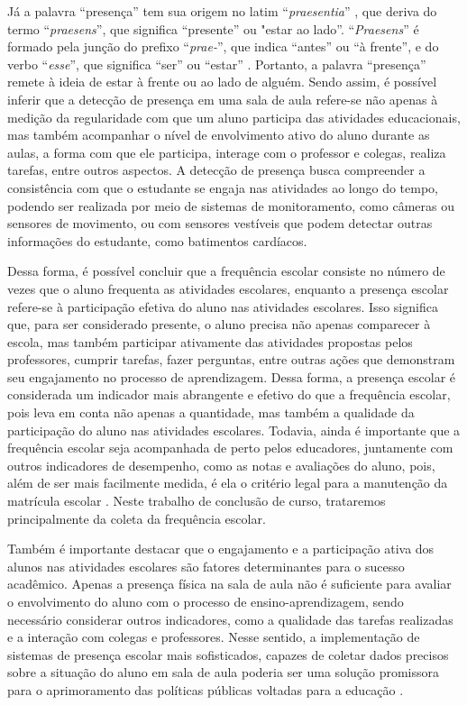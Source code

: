 Já a palavra ``presença'' tem sua origem no latim ``\textit{praesentia}'' \cite{dicionarioëtimologico}, que deriva do termo ``\textit{praesens}'', que significa ``presente'' ou "estar ao lado''. ``\textit{Praesens}'' é formado pela junção do prefixo ``\textit{prae-}'', que indica ``antes'' ou ``à frente'', e do verbo ``\textit{esse}'', que significa ``ser'' ou ``estar'' \cite{eti:presenca}. Portanto, a palavra ``presença'' remete à ideia de estar à frente ou ao lado de alguém. Sendo assim, é possível inferir que a detecção de presença em uma sala de aula refere-se não apenas à medição da regularidade com que um aluno participa das atividades educacionais, mas também acompanhar o nível de envolvimento ativo do aluno durante as aulas, a forma com que ele participa, interage com o professor e colegas, realiza tarefas, entre outros aspectos. A detecção de presença busca compreender a consistência com que o estudante se engaja nas atividades ao longo do tempo, podendo ser realizada por meio de sistemas de monitoramento, como câmeras ou sensores de movimento, ou com sensores vestíveis que podem detectar outras informações do estudante, como batimentos cardíacos.

Dessa forma, é possível concluir que a frequência escolar consiste no número de vezes que o aluno frequenta as atividades escolares, enquanto a presença escolar refere-se à participação efetiva do aluno nas atividades escolares. Isso significa que, para ser considerado presente, o aluno precisa não apenas comparecer à escola, mas também participar ativamente das atividades propostas pelos professores, cumprir tarefas, fazer perguntas, entre outras ações que demonstram seu engajamento no processo de aprendizagem. Dessa forma, a presença escolar é considerada um indicador mais abrangente e efetivo do que a frequência escolar, pois leva em conta não apenas a quantidade, mas também a qualidade da participação do aluno nas atividades escolares. Todavia, ainda é importante que a frequência escolar seja acompanhada de perto pelos educadores, juntamente com outros indicadores de desempenho, como as notas e avaliações do aluno, pois, além de ser mais facilmente medida, é ela o critério legal para a manutenção da matrícula escolar \cite{planalto:1996}. Neste trabalho de conclusão de curso, trataremos principalmente da coleta da frequência escolar.

Também é importante destacar que o engajamento e a participação ativa dos alunos nas atividades escolares são fatores determinantes para o sucesso acadêmico. Apenas a presença física na sala de aula não é suficiente para avaliar o envolvimento do aluno com o processo de ensino-aprendizagem, sendo necessário considerar outros indicadores, como a qualidade das tarefas realizadas e a interação com colegas e professores. Nesse sentido, a implementação de sistemas de presença escolar mais sofisticados, capazes de coletar dados precisos sobre a situação do aluno em sala de aula poderia ser uma solução promissora para o aprimoramento das políticas públicas voltadas para a educação \cite{ferreira:2020}.

